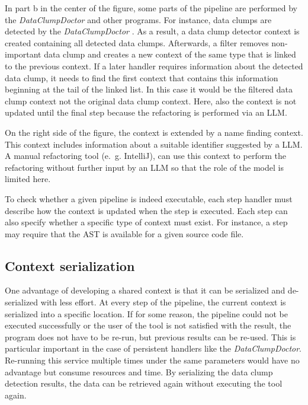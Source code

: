 In part b in the center of the figure, some parts of the pipeline are performed by the \textit{DataClumpDoctor} and other programs. For instance, data clumps are detected by the \textit{DataClumpDoctor} . As a result, a data clump detector context is created containing all detected data clumps. Afterwards, a filter removes non-important data clump and creates a new context of the same type that is linked to the previous context. If a later handler requires information about the detected data clump, it needs to find the first context that contains this information  beginning at the tail of the linked list. In this case it would be the filtered data clump context not the original data clump context. Here, also the context is not updated until the final step because the refactoring is performed via an \ac{LLM}. 

On the right side of the figure, the context is extended by a name finding context. This context includes information about a suitable identifier suggested by a \ac{LLM}. A manual refactoring tool (e.~g. IntelliJ), can use this context to perform the refactoring without further input by an \ac{LLM} so that the role of the model is limited here. 




To check whether a given pipeline is indeed executable, each step handler must describe how the context is updated when the step is executed. Each step can also specify whether a specific type of context must exist. For instance, a step may require that the \ac{AST} is available for a given source code file. 


\subsection{Context serialization}

One advantage of developing a shared context is that it can be serialized  and de-serialized with less effort. At every step of the pipeline, the current context is serialized into a specific location. If for some reason, the pipeline could not be executed successfully or the user of the tool is not satisfied with the result, the program does not have to be re-run, but previous results can be re-used. This is particular important in the case of persistent handlers like the \textit{DataClumpDoctor}. Re-running this service multiple times under the same parameters would have no advantage but consume resources and time. By serializing the data clump detection results, the data can be retrieved again without executing the tool again.


